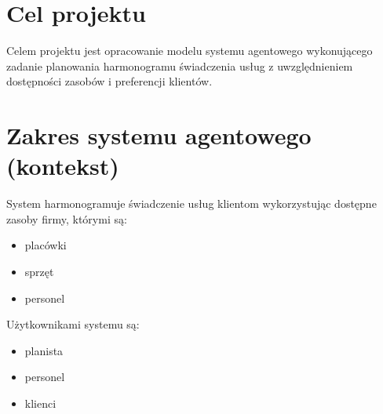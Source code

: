 \documentclass[oneside]{article}
\begin{document}

\section{Cel projektu}
Celem projektu jest opracowanie modelu systemu agentowego
wykonującego zadanie planowania harmonogramu świadczenia usług
z uwzględnieniem dostępności zasobów i preferencji klientów.

\section{Zakres systemu agentowego (kontekst)} \label{Zakres}
System harmonogramuje świadczenie usług klientom wykorzystując dostępne zasoby firmy, którymi są:
\begin{itemize}
	\item{placówki}
	\item{sprzęt}
	\item{personel}
\end{itemize}
Użytkownikami systemu są:
\begin{itemize}
	\item{planista}
	\item{personel}
	\item{klienci}
\end{itemize}







\end{document}
